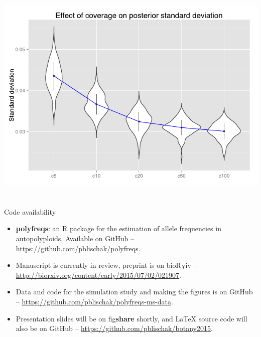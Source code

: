 \documentclass[presentation]{beamer}
\begin{document}
\begin{frame}[c]{}
	\begin{center}
		\includegraphics[width=\textwidth]{fig/figure4-coverage-sd}
	\end{center}
\end{frame}

\section*{}

\begin{frame}[t,plain]{Code availability}
	\fontsize{10pt}{10}\selectfont
	\begin{itemize}
		\item \textbf{polyfreqs}: an R package for the estimation of allele frequencies in autopolyploids. Available on GitHub -- \url{https://github.com/pblischak/polyfreqs}.
		\vspace{0.2in}
		
		\item Manuscript is currently in review, preprint is on bioR$\chi$iv -- \url{http://biorxiv.org/content/early/2015/07/02/021907}.
		\vspace{0.2in}
	
		\item Data and code for the simulation study and making the figures is on GitHub -- \url{https://github.com/pblischak/polyfreqs-ms-data}.
		\vspace{0.2in}
	
		\item Presentation slides will be on fig\textbf{share} shortly, and \LaTeX{} source code will also be on GitHub -- \url{https://github.com/pblischak/botany2015}.
	\end{itemize}
\end{frame}
\end{document}
